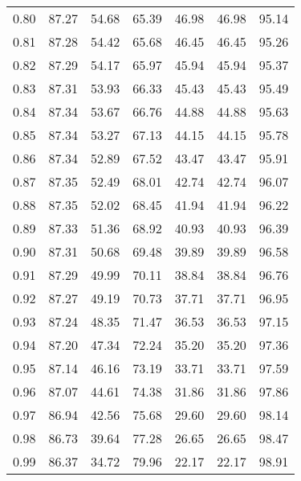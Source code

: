 \begin{tabular}{|c|c|c|c|c|c|c|}
      0.80 &     87.27 &     54.68 &      65.39 &   46.98 &      46.98 &         95.14 \\
      0.81 &     87.28 &     54.42 &      65.68 &   46.45 &      46.45 &         95.26 \\
      0.82 &     87.29 &     54.17 &      65.97 &   45.94 &      45.94 &         95.37 \\
      0.83 &     87.31 &     53.93 &      66.33 &   45.43 &      45.43 &         95.49 \\
      0.84 &     87.34 &     53.67 &      66.76 &   44.88 &      44.88 &         95.63 \\
      0.85 &     87.34 &     53.27 &      67.13 &   44.15 &      44.15 &         95.78 \\
      0.86 &     87.34 &     52.89 &      67.52 &   43.47 &      43.47 &         95.91 \\
      0.87 &     87.35 &     52.49 &      68.01 &   42.74 &      42.74 &         96.07 \\
      0.88 &     87.35 &     52.02 &      68.45 &   41.94 &      41.94 &         96.22 \\
      0.89 &     87.33 &     51.36 &      68.92 &   40.93 &      40.93 &         96.39 \\
      0.90 &     87.31 &     50.68 &      69.48 &   39.89 &      39.89 &         96.58 \\
      0.91 &     87.29 &     49.99 &      70.11 &   38.84 &      38.84 &         96.76 \\
      0.92 &     87.27 &     49.19 &      70.73 &   37.71 &      37.71 &         96.95 \\
      0.93 &     87.24 &     48.35 &      71.47 &   36.53 &      36.53 &         97.15 \\
      0.94 &     87.20 &     47.34 &      72.24 &   35.20 &      35.20 &         97.36 \\
      0.95 &     87.14 &     46.16 &      73.19 &   33.71 &      33.71 &         97.59 \\
      0.96 &     87.07 &     44.61 &      74.38 &   31.86 &      31.86 &         97.86 \\
      0.97 &     86.94 &     42.56 &      75.68 &   29.60 &      29.60 &         98.14 \\
      0.98 &     86.73 &     39.64 &      77.28 &   26.65 &      26.65 &         98.47 \\
      0.99 &     86.37 &     34.72 &      79.96 &   22.17 &      22.17 &         98.91 \\
\bottomrule
\end{tabular}
